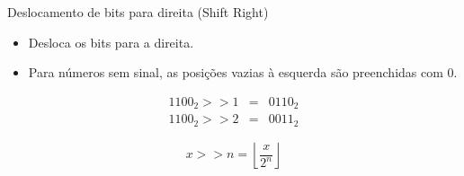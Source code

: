 

\begin{frame}{Deslocamento de bits para direita (Shift Right)}
    \begin{itemize}
        \item Desloca os bits para a direita.
        \item Para números sem sinal, as posições vazias à esquerda
              são preenchidas com $0$.
    \end{itemize}

    \[
    \begin{array}{rcl}
        1100_{2} >> 1 & = & 0110_{2} \\
        1100_{2} >> 2 & = & 0011_{2}
    \end{array}
    \]

    \vspace{0.3cm}

    \[
        x >> n =
        \left\lfloor
        \frac{x}{2^n}
        \right\rfloor
    \]

\end{frame}

